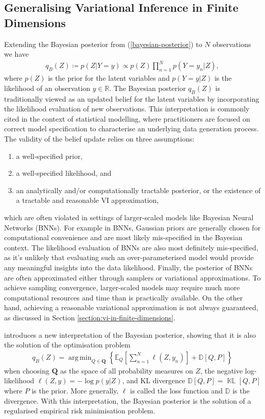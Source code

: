 \documentclass{article}
\newcommand{\KLD}{\operatorname{\mathbb{KL}}}
\DeclareMathOperator*{\argmin}{arg\,min}
\numberwithin{equation}{section}
\begin{document}
\subsection{Generalising Variational Inference in Finite Dimensions}
Extending the Bayesian posterior from (\ref{bayesian-posterior}) to $N$ observations we have
\begin{align}
    \label{bayesian-posterior-gvi}
    q_B(Z) \coloneqq p(Z\vert Y=y) \propto p(Z) \prod_{n=1}^N p(Y=y_n \vert Z),
\end{align}
where $p(Z)$ is the prior for the latent variables and $p(Y=y \vert Z)$ is the likelihood of an observation $y \in \mathbb{R}$.
The Bayesian posterior $q_B(Z)$ is traditionally viewed as an updated belief for the latent variables by incorporating the likelihood evaluation of new observations.
This interpretation is commonly cited in the context of statistical modelling, where practitioners are focused on correct model specification to characterise an underlying data generation process. The validity of the belief update relies on three assumptions:
\begin{enumerate}
    \item a well-specified prior,
    \item a well-specified likelihood, and
    \item an analytically and/or computationally tractable posterior, or the existence of a tractable and reasonable VI approximation,
\end{enumerate}
which are often violated in settings of larger-scaled models like Bayesian Neural Networks (BNNs).
For example in BNNs, Gaussian priors are generally chosen for computational convenience and are most likely mis-specified in the Bayesian context.
The likelihood evaluation of BNNs are also most definitely mis-specified, as it's unlikely that evaluating such an over-parameterised model would provide any meaningful insights into the data likelihood.
Finally, the posterior of BNNs are often approximated either through samplers or variational approximations.
To achieve sampling convergence, larger-scaled models may require much more computational resources and time than is practically available.
On the other hand, achieving a reasonable variational approximation is not always guaranteed, as discussed in Section \ref{section:vi-in-finite-dimensions}.

\cite{knoblauch2022optimization} introduces a new interpretation of the Bayesian posterior, showing that it is also the solution of the optimisation problem
\begin{align}
    q_B(Z) = \argmin_{Q \in \boldsymbol{Q}} \left\{\mathbb{E}_{Q}\left[\sum_{n=1}^N \ell \left(Z, y_n\right)\right] + \mathbb{D}\left[Q, P\right]\right\}
    \label{gvi-posterior}
\end{align}
when choosing $\boldsymbol{Q}$ as the space of all probability measures on $Z$, the negative log-likelihood $\ell(Z, y) =-\log p\left(y \vert Z\right)$,  and KL divergence $\mathbb{D}\left[Q, P\right] = \KLD\left[Q, P\right]$ where $P$ is the prior.
More generally, $\ell$ is called the loss function and $\mathbb{D}$ is the divergence. With this interpretation, the Bayesian posterior is the solution of a regularised empirical risk minimisation problem.
\end{document}
